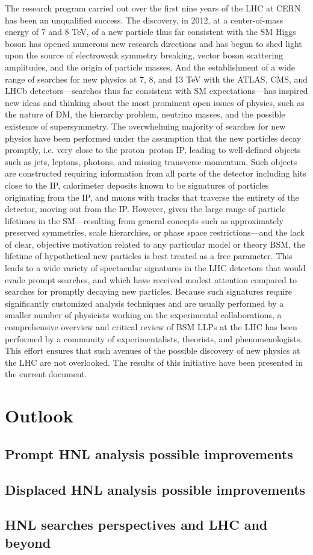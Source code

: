 The research program carried out over the first nine years of
  the LHC at CERN has been an
unqualified success. The discovery, in 2012, at a 
center-of-mass energy of 7 and 8 TeV, of a
new particle thus far consistent with the SM Higgs boson has opened
numerous new research
directions and has begun to shed light upon the source of electroweak symmetry breaking,
vector boson scattering amplitudes, and the origin of particle masses. And the establishment
of a wide range of searches for new physics at 7, 8, and 13 TeV with the ATLAS, CMS, and
LHCb detectors—searches thus far consistent with SM expectations—has inspired new ideas
and thinking about the most prominent open issues of physics, such as the nature of DM, the
hierarchy problem, neutrino masses, and the possible existence of supersymmetry.
The overwhelming majority of searches for new physics have been performed under the
assumption that the new particles decay promptly, i.e. very close to the proton–proton IP,
leading to well-defined objects such as jets, leptons, photons, and missing transverse
momentum. Such objects are constructed requiring information from all parts of the detector
including hits close to the IP, calorimeter deposits known to be signatures of particles originating
from the IP, and muons with tracks that traverse the entirety of the detector, moving
out from the IP. However, given the large range of particle lifetimes in the SM—resulting
from general concepts such as approximately preserved symmetries, scale hierarchies, or
phase space restrictions—and the lack of clear, objective motivation related to any particular
model or theory BSM, the lifetime of hypothetical new particles is best treated as a free
parameter. This leads to a wide variety of spectacular signatures in the LHC detectors that
would evade prompt searches, and which have received modest attention compared to
searches for promptly decaying new particles. Because such signatures require significantly
customized analysis techniques and are usually performed by a smaller number of physicists
working on the experimental collaborations, a comprehensive overview and critical review of
BSM LLPs at the LHC has been performed by a community of experimentalists, theorists,
and phenomenologists. This effort ensures that such avenues of the possible discovery of new
physics at the LHC are not overlooked. The results of this initiative have been presented in the
current document.


\section{Outlook}




\subsection{Prompt HNL analysis possible improvements}
\subsection{Displaced HNL analysis possible improvements}
\subsection {HNL searches perspectives and LHC and beyond}


